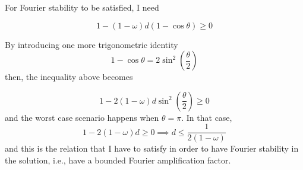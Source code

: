 For Fourier stability to be satisfied, I need

\[
	1 - (1 - \omega)d (1-\cos\theta) \geq 0
\]

By introducing one more trigonometric identity
\[
	1 - \cos\theta = 2 \sin^2{\left( \frac{\theta}{2} \right)}
\]
then, the inequality above becomes

\[
	1 - 2 (1 - \omega)d \sin^2{\left( \frac{\theta}{2} \right)} \geq 0
\]
and the worst case scenario happens when \(\theta = \pi\). In that case,
\[
	1 - 2(1 - \omega)d \geq 0 \implies d \leq \frac{1}{2(1-\omega)}
\]
and this is the relation that I have to satisfy in order to have Fourier stability in the solution, i.e., have a bounded Fourier amplification factor.

